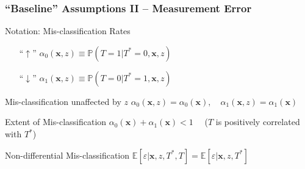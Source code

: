 \documentclass{beamer}
\begin{document}
\begin{frame}
  \frametitle{``Baseline'' Assumptions II -- Measurement Error}


  \begin{alertblock}{Notation: Mis-classification Rates}
    \begin{itemize}
      \item[``$\boldsymbol{\uparrow}$''] 
    $\alpha_0(\mathbf{x},z) \equiv \mathbb{P}\left(T=1|T^*=0,\mathbf{x},z  \right)$
  \item[``$\boldsymbol{\downarrow}$''] 
  $\alpha_1(\mathbf{x},z) \equiv \mathbb{P}\left(T=0|T^*=1,\mathbf{x},z  \right)$
    \end{itemize}
  \end{alertblock}

  \begin{block}{Mis-classification unaffected by $z$}
    $\alpha_0(\mathbf{x},z) = \alpha_0(\mathbf{x}), \quad   \alpha_1(\mathbf{x},z) = \alpha_1(\mathbf{x})$
  \end{block}

  \begin{block}{Extent of Mis-classification}
      $\alpha_0(\mathbf{x}) + \alpha_1(\mathbf{x}) < 1 \quad$ ($T$ is positively correlated with $T^*$)
  \end{block}

  \begin{block}{Non-differential Mis-classification}
     $\mathbb{E}[\varepsilon|\mathbf{x},z,T^*,T] = \mathbb{E}[\varepsilon|\mathbf{x},z, T^*]$
  \end{block}



\end{frame}
\end{document}
